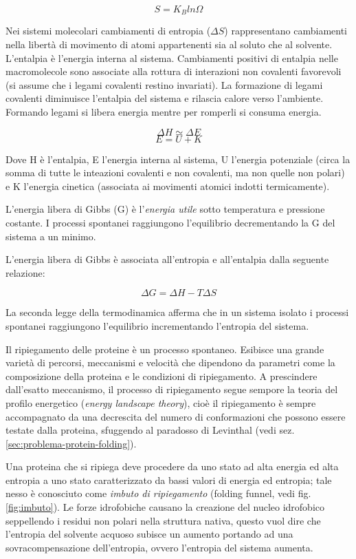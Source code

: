 {{\[ S = K_{B}ln{\Omega} \]

Nei sistemi molecolari cambiamenti di entropia ($\Delta S$) rappresentano cambiamenti nella libertà di movimento di atomi appartenenti sia al soluto che al solvente.  L'entalpia è l'energia interna al sistema. Cambiamenti positivi di entalpia nelle macromolecole sono associate alla rottura di interazioni non covalenti favorevoli (si assume che i legami covalenti restino invariati). La formazione di legami covalenti diminuisce l'entalpia del sistema e rilascia calore verso l'ambiente. Formando legami si libera energia mentre per romperli si consuma energia.

\[ \Delta H \simeq \Delta E \] 
\[ E = U + K \]

Dove H è l'entalpia, E l'energia interna al sistema, U l'energia potenziale (circa la somma di tutte le inteazioni covalenti e non covalenti, ma non quelle non polari) e K l'energia cinetica (associata ai movimenti atomici indotti termicamente).\\

\par L'energia libera di Gibbs (G) è l'\textit{energia utile} sotto temperatura e pressione costante. I processi spontanei raggiungono l'equilibrio decrementando la G del sistema a un minimo.

L'energia libera di Gibbs è associata all'entropia e all'entalpia dalla seguente relazione:

\[ \Delta G = \Delta H - T \Delta S \]

\par La seconda legge della termodinamica afferma che in un sistema isolato i processi spontanei raggiungono l'equilibrio incrementando l'entropia del sistema. 

\par Il ripiegamento delle proteine è un processo spontaneo. Esibisce una grande varietà di percorsi, meccanismi e velocità che dipendono da parametri come la composizione della proteina e le condizioni di ripiegamento. A prescindere dall'esatto meccanismo, il processo di ripiegamento segue sempore la teoria del profilo energetico (\textit{energy landscape theory}), cioè il ripiegamento è sempre accompagnato da una decrescita del numero di conformazioni che possono essere testate dalla proteina, sfuggendo al paradosso di Levinthal (vedi sez. \ref{sec:problema-protein-folding}).

\par Una proteina che si ripiega deve procedere da uno stato ad alta energia ed alta entropia a uno stato caratterizzato da bassi valori di energia ed entropia;
tale nesso è conosciuto come \textit{imbuto di ripiegamento} (folding funnel, vedi fig. \ref{fig:imbuto}). Le forze idrofobiche causano la creazione del nucleo idrofobico seppellendo i residui non polari nella struttura nativa, questo vuol dire che l'entropia del solvente acquoso subisce un aumento portando ad una sovracompensazione dell'entropia, ovvero l'entropia del sistema aumenta.

}}
